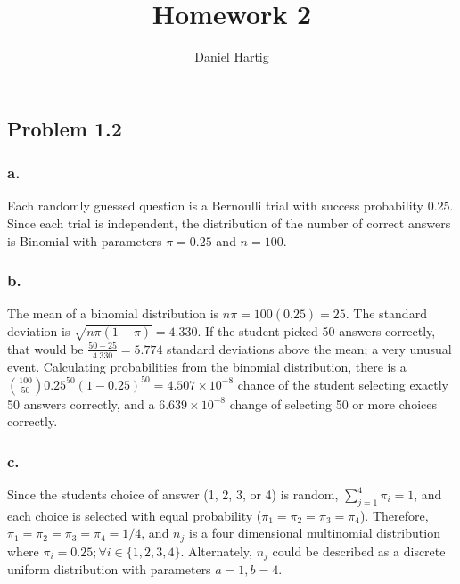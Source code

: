 \documentclass{article}
\title{Homework 2}
\author{Daniel Hartig}
\begin{document}
\maketitle

\titlespacing{\subsection}{0pt}{0pt}{0pt}
\titlespacing{\subsubsection}{0pt}{0pt}{-\parskip}

\subsection*{Problem 1.2}
\subsubsection*{a.}
Each randomly guessed question is a Bernoulli trial with success probability 0.25. Since each trial is independent, the distribution of the number of correct answers is Binomial with parameters $\pi=0.25$ and $n=100$.

\subsubsection*{b.}
The mean of a binomial distribution is $n\pi = 100(0.25) = 25$. The standard deviation is $\sqrt{n\pi(1-\pi)} = 4.330$. If the student picked 50 answers correctly, that would be $\frac{50-25}{4.330} = 5.774$ standard deviations above the mean; a very unusual event. Calculating probabilities from the binomial distribution, there is a $\binom{100}{50}0.25^{50}(1-0.25)^{50} = 4.507\times10^{-8}$ chance of the student selecting exactly 50 answers correctly, and a $6.639\times10^{-8}$ change of selecting 50 or more choices correctly. 

\subsubsection*{c.}
Since the students choice of answer (1, 2, 3, or 4) is random,  $\sum_{j=1}^4 \pi_i = 1$, and each choice is selected with equal probability ($\pi_1 = \pi_2 = \pi_3 = \pi_4$). Therefore, $\pi_1 = \pi_2 = \pi_3 = \pi_4 = 1/4$, and $n_j$ is a four dimensional multinomial distribution where $\pi_i = 0.25; \forall i \in \{1, 2, 3, 4\}$. Alternately, $n_j$ could be described as a discrete uniform distribution with parameters $a=1, b=4$. 
\end{document}
